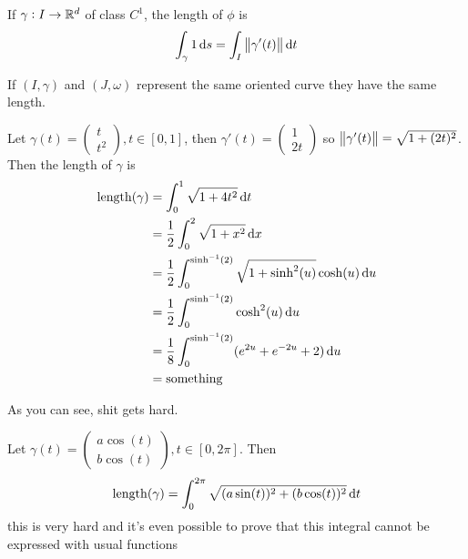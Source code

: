 \documentclass[12pt]{extarticle}
\begin{document}
\begin{definition}
    If $\gamma: I \to \mathbb{R}^d$ of class $C^1$, the length of $\phi$ is
    \begin{equation}
        \int_\gamma 1 \dd{s} = \int_I \norm{\gamma'(t)} \dd{t}
    \end{equation}
\end{definition}

\begin{lemma}
    If $(I, \gamma)$ and $(J, \omega)$ represent the same oriented curve they have the same length.
\end{lemma}

\begin{example}[length of $y = x^2$ between $(0,0)$ and $(1,1)$]
    Let $\gamma(t) = \begin{pmatrix}
            t \\ t^2
        \end{pmatrix}, t \in [0, 1]$,
    then $\gamma'(t) = \begin{pmatrix}
            1 \\ 2t
        \end{pmatrix}$
    so $\norm{\gamma'(t)} = \sqrt{1+(2t)^2}$.
    Then the length of $\gamma$ is
    \begin{align}
        {\operatorfont length}(\gamma) & = \int_0^1 \sqrt{1 + 4t^2} \dd{t}                                        \\
                                       & = \frac{1}{2} \int_0^2 \sqrt{1+x^2} \dd{x}                               \\
                                       & = \frac{1}{2} \int_0^{\sinh^{-1}(2)} \sqrt{1+\sinh^2(u)} \cosh(u) \dd{u} \\
                                       & = \frac{1}{2} \int_0^{\sinh^{-1}(2)} \cosh^2(u) \dd{u}                   \\
                                       & = \frac{1}{8} \int_0^{\sinh^{-1}(2)} (e^{2u} + e^{-2u} + 2) \dd{u}       \\
                                       & = \text{something}
    \end{align}

    As you can see, shit gets hard.
\end{example}

\begin{example}
    Let $\gamma(t) = \begin{pmatrix}
            a \cos (t) \\
            b \cos (t)
        \end{pmatrix}, t \in[0, 2\pi]$.
    Then
    \begin{equation}
        {\operatorfont length}(\gamma) = \int_0^{2\pi} \sqrt{(a \sin(t))^2 + (b \cos (t))^2} \dd{t}
    \end{equation}
    this is very hard and it's even possible to prove that this integral cannot be expressed with usual functions
\end{example}
\end{document}
